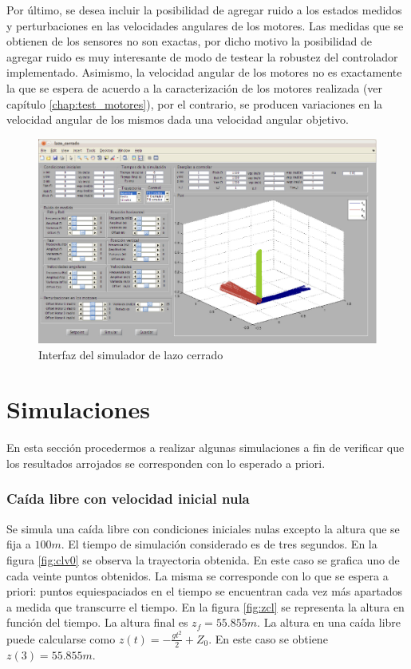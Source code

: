 \documentclass[main]{subfiles}
\begin{document}
Por \'ultimo, se desea incluir la posibilidad de agregar ruido a los estados medidos y perturbaciones en las velocidades angulares de los motores. Las medidas que se obtienen de los sensores no son exactas, por dicho motivo la posibilidad de agregar ruido es muy interesante de modo de testear la robustez del controlador implementado. Asimismo, la velocidad angular de los motores no es exactamente la que se espera de acuerdo a la caracterizaci\'on de los motores realizada (ver cap\'itulo \ref{chap:test_motores}), por el contrario, se producen variaciones en la velocidad angular de los mismos dada una velocidad angular objetivo.
  \begin{figure}[h!]
	\centering
	\includegraphics[width=1\textwidth]{./pics_simulador/vistac.pdf}
	\caption{Interfaz del simulador de lazo cerrado}
	\label{fig:vistac}
\end{figure}

\section{Simulaciones}
En esta secci\'on procedermos a realizar algunas simulaciones a fin de verificar que los resultados arrojados se corresponden con lo esperado a priori. 

\subsubsection{Ca\'ida libre con velocidad inicial nula}

Se simula una ca\'ida libre con condiciones iniciales nulas excepto la altura que se fija a $100m$. El tiempo de simulaci\'on considerado es de tres segundos. En la figura \ref{fig:clv0} se observa la trayectoria obtenida. En este caso se grafica uno de cada veinte puntos obtenidos. La misma se corresponde con lo que se espera a priori: puntos equiespaciados en el tiempo se encuentran cada vez m\'as apartados a medida que transcurre el tiempo. En la figura \ref{fig:zcl} se representa la altura en funci\'on del tiempo. La altura final es $z_f=55.855m$. La altura en una ca\'ida libre puede calcularse como $z(t)=-\frac{gt^2}{2}+Z_0$. En este caso se obtiene $z(3)=55.855m$.
\end{document}
